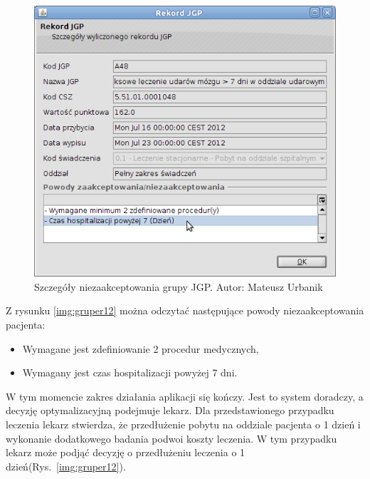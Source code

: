 \begin{figure}%
\centering
\includegraphics[scale=0.4]{images/gruper11}
\caption[Widok grupera]{Szczegóły niezaakceptowania grupy JGP. Autor: Mateusz Urbanik}
\label{img:gruper11}
\end{figure}

Z rysunku \ref{img:gruper12} można odczytać następujące powody niezaakceptowania pacjenta:
\begin{itemize}
 \item Wymagane jest zdefiniowanie 2 procedur medycznych,
 \item Wymagany jest czas hospitalizacji powyżej 7 dni.
\end{itemize}

W tym momencie zakres działania aplikacji się kończy. Jest to system doradczy, a decyzję optymalizacyjną podejmuje lekarz. Dla przedstawionego przypadku leczenia lekarz stwierdza, że przedłużenie pobytu na oddziale pacjenta o 1 dzień i wykonanie dodatkowego badania podwoi koszty leczenia. W tym przypadku lekarz może podjąć decyzję o przedłużeniu leczenia o 1 dzień(Rys.~\ref{img:gruper12}).

